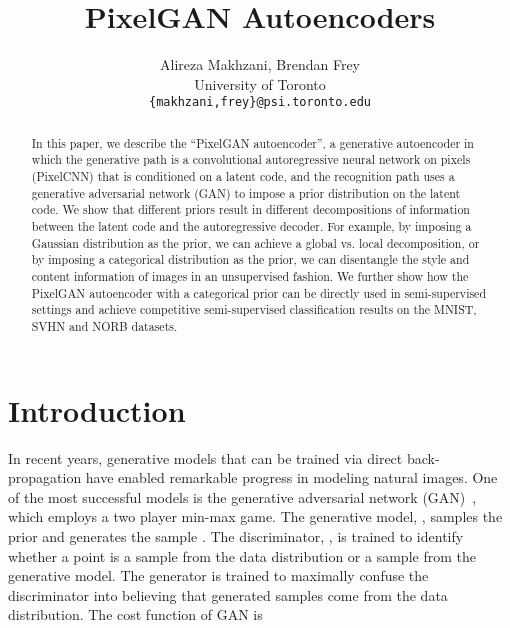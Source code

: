 \documentclass{article}
\title{PixelGAN Autoencoders}
\author{
Alireza Makhzani, Brendan Frey\\
University of Toronto\\
\texttt{\{makhzani,frey\}@psi.toronto.edu}
}
\begin{document}
\maketitle

\begin{abstract}
In this paper, we describe the ``PixelGAN autoencoder'', a generative autoencoder in which the generative path is a convolutional autoregressive neural network on pixels (PixelCNN) that is conditioned on a latent code, and the recognition path uses a generative adversarial network (GAN) to impose a prior distribution on the latent code. We show that different priors result in different decompositions of information between the latent code and the autoregressive decoder. For example, by imposing a Gaussian distribution as the prior, we can achieve a global vs. local decomposition, or by imposing a categorical distribution as the prior, we can disentangle the style and content information of images in an unsupervised fashion. We further show how the PixelGAN autoencoder with a categorical prior can be directly used in semi-supervised settings and achieve competitive semi-supervised classification results on the MNIST, SVHN and NORB datasets.
\end{abstract}


\section{Introduction}
In recent years, generative models that can be trained via direct back-propagation have enabled remarkable progress in modeling natural images. One of the most successful models is the generative adversarial network (GAN)~\citep{gan}, which employs a two player min-max game. The generative model, , samples the prior  and generates the sample . The discriminator, , is trained to identify whether a point  is a sample from the data distribution or a sample from the generative model. The generator is trained to maximally confuse the discriminator into believing that generated samples come from the data distribution. The cost function of GAN is
\end{document}

